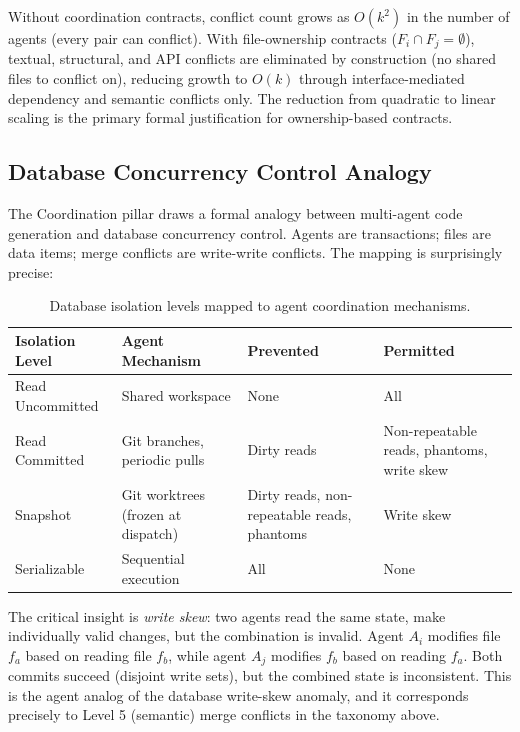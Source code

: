 \documentclass[11pt, a4paper, logo, copyright]{googledeepmind}
\begin{document}
Without coordination contracts, conflict count grows as $O(k^2)$ in the number of agents (every pair can conflict). With file-ownership contracts ($F_i \cap F_j = \emptyset$), textual, structural, and API conflicts are eliminated by construction (no shared files to conflict on), reducing growth to $O(k)$ through interface-mediated dependency and semantic conflicts only. The reduction from quadratic to linear scaling is the primary formal justification for ownership-based contracts.

\subsection{Database Concurrency Control Analogy}

The Coordination pillar draws a formal analogy between multi-agent code generation and database concurrency control. Agents are transactions; files are data items; merge conflicts are write-write conflicts. The mapping is surprisingly precise:

\begin{table}[ht]
\centering
\caption{Database isolation levels mapped to agent coordination mechanisms.}
\label{tab:isolation-levels}
\footnotesize
\begin{tabular}{p{2.2cm}p{3.2cm}p{3cm}p{3cm}}
\toprule
\textbf{Isolation Level} & \textbf{Agent Mechanism} & \textbf{Prevented} & \textbf{Permitted} \\
\midrule
Read Uncommitted & Shared workspace & None & All \\
Read Committed & Git branches, periodic pulls & Dirty reads & Non-repeatable reads, phantoms, write skew \\
Snapshot & Git worktrees (frozen at dispatch) & Dirty reads, non-repeatable reads, phantoms & Write skew \\
Serializable & Sequential execution & All & None \\
\bottomrule
\end{tabular}
\end{table}

The critical insight is \emph{write skew}: two agents read the same state, make individually valid changes, but the combination is invalid. Agent $A_i$ modifies file $f_a$ based on reading file $f_b$, while agent $A_j$ modifies $f_b$ based on reading $f_a$. Both commits succeed (disjoint write sets), but the combined state is inconsistent. This is the agent analog of the database write-skew anomaly, and it corresponds precisely to Level 5 (semantic) merge conflicts in the taxonomy above.
\end{document}
